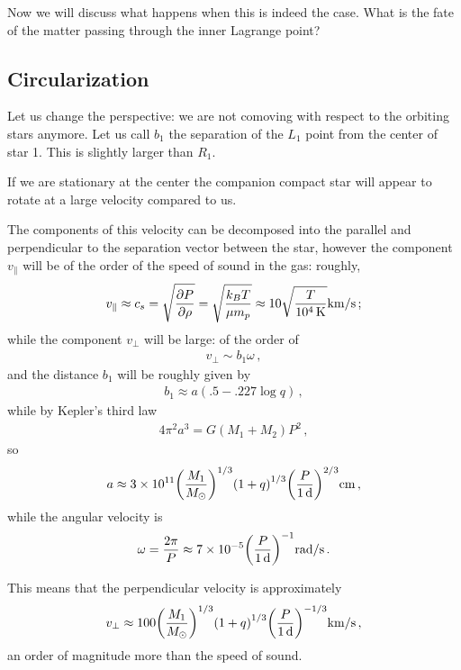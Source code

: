 \documentclass[main.tex]{subfiles}
\begin{document}
Now we will discuss what happens when this is indeed the case. What is the fate of the matter passing through the inner Lagrange point? 

\subsection{Circularization}

Let us change the perspective: we are not comoving with respect to the orbiting stars anymore. 
Let us call \(b_1 \) the separation of the \(L_1 \) point from the center of star 1. This is slightly larger than \(R_1 \). 

If we are stationary at the center the companion compact star will appear to rotate at a large velocity compared to us. 

The components of this velocity can be decomposed into the parallel and perpendicular to the separation vector between the star, however the component \(v _ \parallel\) will be of the order of the speed of sound in the gas: roughly, 
%
\begin{align}
v_{\parallel} \approx c_s = \sqrt{ \pdv{P}{\rho }} = \sqrt{\frac{k_B T}{\mu m_p}} \approx \num{10} \sqrt{ \frac{T}{\SI{e4}{K}}} \SI{}{km /s}
\,;
\end{align}
%
while the component \(v_\perp\) will be large: of the order of 
%
\begin{align}
v_\perp \sim b_1 \omega 
\,,
\end{align}
%
and the distance \(b_1\) will be roughly given by \cite[]{plavecTablesRocheModel1964}
%
\begin{align}
b_1 \approx a (\num{.5} - \num{.227} \log q)
\,,
\end{align}
%
while by Kepler's third law 
%
\begin{align}
4 \pi^2 a^3 = G (M_1 + M_2 ) P^2
\,,
\end{align}
%
so 
%
\begin{align}
a \approx \num{3e11} \qty(\frac{M_1 }{M_{\odot}})^{1/3}
\qty(1 + q)^{1/3}
\qty(\frac{P}{\SI{1}{d}})^{2/3} 
\SI{}{cm}
\,,
\end{align}
%
while the angular velocity is 
%
\begin{align}
\omega = \frac{2 \pi }{P} \approx \num{7e-5} \qty(\frac{P}{\SI{1}{d}})^{-1} \SI{}{rad/s}
\,.
\end{align}

This means that the perpendicular velocity is approximately 
%
\begin{align}
v_{\perp} \approx \num{100} \qty(\frac{M_1 }{M_{\odot}})^{1/3}
\qty(1 + q)^{1/3}
\qty(\frac{P}{\SI{1}{d}})^{-1/3}
\SI{}{km/s}
\,,
\end{align}
%
an order of magnitude more than the speed of sound. 
\end{document}
